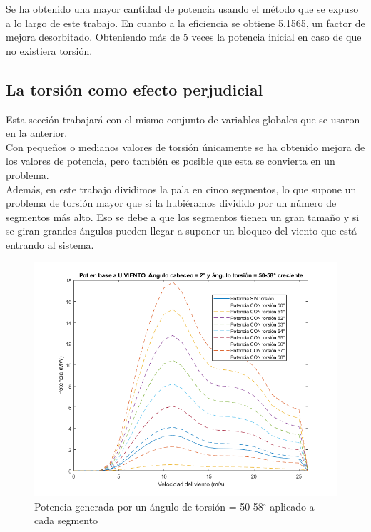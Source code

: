 Se ha obtenido una mayor cantidad de potencia usando el método que se expuso a lo largo de este trabajo. En cuanto a la eficiencia se obtiene 5.1565, un factor de mejora desorbitado. Obteniendo más de 5 veces la potencia inicial en caso de que no existiera torsión.\\

\subsection{La torsión como efecto perjudicial}

Esta sección trabajará con el mismo conjunto de variables globales que se usaron en la anterior.\\

Con pequeños o medianos valores de torsión únicamente se ha obtenido mejora de los valores de potencia, pero también es posible que esta se convierta en un problema.\\

Además, en este trabajo dividimos la pala en cinco segmentos, lo que supone un problema de torsión mayor que si la hubiéramos dividido por un número de segmentos más alto. Eso se debe a que los segmentos tienen un gran tamaño y si se giran grandes ángulos pueden llegar a suponer un bloqueo del viento que está entrando al sistema.\\

\begin{figure}[H]
    \centering
    \includegraphics[width=1\textwidth]{images/torsion 50-58 creciente.png}
    \caption{Potencia generada por un ángulo de torsión = 50-58$^{\circ}$ aplicado a cada segmento}
     \label{fig:torsion_crece50-58}
\end{figure}

